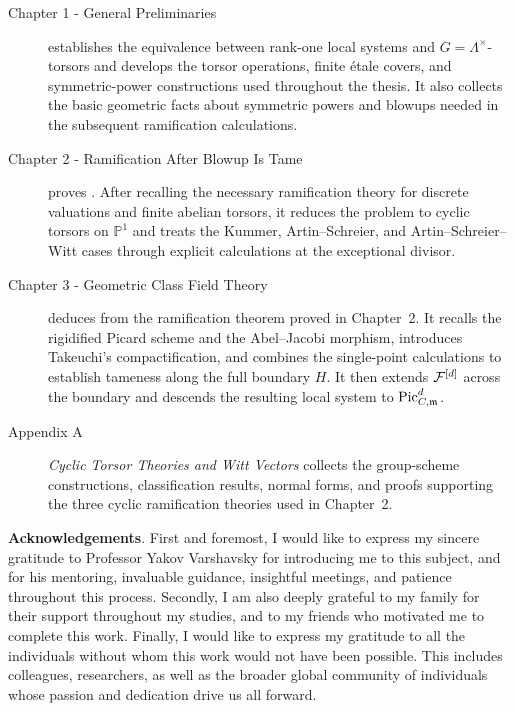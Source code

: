 \begin{description}
    \item[Chapter 1 - General Preliminaries] establishes the equivalence between rank-one local systems and $G=\Lambda^\times$-torsors and develops the torsor operations, finite \'etale covers, and symmetric-power constructions used throughout the thesis. It also collects the basic geometric facts about symmetric powers and blowups needed in the subsequent ramification calculations.
    \item[Chapter 2 - Ramification After Blowup Is Tame] proves . After recalling the necessary ramification theory for discrete valuations and finite abelian torsors, it reduces the problem to cyclic torsors on $\mathbb P^1$ and treats the Kummer, Artin--Schreier, and Artin--Schreier--Witt cases through explicit calculations at the exceptional divisor.
    \item[Chapter 3 - Geometric Class Field Theory] deduces  from the ramification theorem proved in Chapter~2. It recalls the rigidified Picard scheme and the Abel--Jacobi morphism, introduces Takeuchi's compactification, and combines the single-point calculations to establish tameness along the full boundary $H$. It then extends $\cF^{[d]}$ across the boundary and descends the resulting local system to $\PicCm[d]$.
    \item[Appendix A] \emph{Cyclic Torsor Theories and Witt Vectors} collects the group-scheme constructions, classification results, normal forms, and proofs supporting the three cyclic ramification theories used in Chapter~2.
\end{description}

\noindent \textbf{Acknowledgements}. First and foremost, I would like to express my sincere gratitude to Professor Yakov Varshavsky for introducing me to this subject, and for his mentoring, invaluable guidance, insightful meetings, and patience throughout this process.
Secondly, I am also deeply grateful to my family for their support throughout my studies, and to my friends who motivated me to complete this work.
Finally, I would like to express my gratitude to all the individuals without whom this work would not have been possible. This includes colleagues, researchers, as well as the broader global community of individuals whose passion and dedication drive us all forward.

